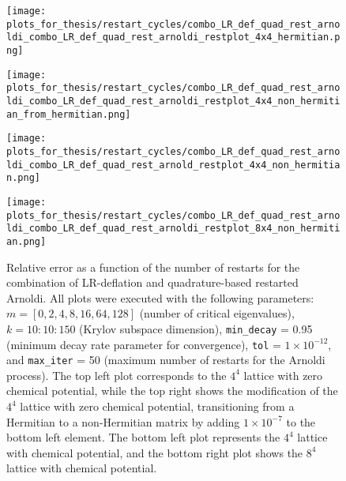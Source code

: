 \begin{figure}[H]
    \centering
    \begin{minipage}{0.45\textwidth}
        \centering
        \texttt{[image: plots\_for\_thesis/restart\_cycles/combo\_LR\_def\_quad\_rest\_arnoldi\_combo\_LR\_def\_quad\_rest\_arnoldi\_restplot\_4x4\_hermitian.png]} %
    \end{minipage}%
    \hspace{0.02\textwidth} %
    \begin{minipage}{0.45\textwidth}
        \centering
        \texttt{[image: plots\_for\_thesis/restart\_cycles/combo\_LR\_def\_quad\_rest\_arnoldi\_combo\_LR\_def\_quad\_rest\_arnoldi\_restplot\_4x4\_non\_hermitian\_from\_hermitian.png]} %
    \end{minipage}
    
    \vspace{0.02\textwidth} %
    
    \begin{minipage}{0.45\textwidth}
        \centering
        \texttt{[image: plots\_for\_thesis/restart\_cycles/combo\_LR\_def\_quad\_rest\_arnoldi\_combo\_LR\_def\_quad\_rest\_arnold\_restplot\_4x4\_non\_hermitian.png]} %
    \end{minipage}%
    \hspace{0.02\textwidth} %
    \begin{minipage}{0.45\textwidth}
        \centering
        \texttt{[image: plots\_for\_thesis/restart\_cycles/combo\_LR\_def\_quad\_rest\_arnoldi\_combo\_LR\_def\_quad\_rest\_arnoldi\_restplot\_8x4\_non\_hermitian.png]} %
    \end{minipage}
    
    \caption{\small Relative error as a function of the number of restarts for the combination of LR-deflation and quadrature-based restarted Arnoldi. All plots were executed with the following parameters: $m = [0, 2, 4, 8, 16, 64, 128]$ (number of critical eigenvalues), $k = 10:10:150$ (Krylov subspace dimension), \texttt{min\_decay} = 0.95 (minimum decay rate parameter for convergence), \texttt{tol} = $1 \times 10^{-12}$, and \texttt{max\_iter} = 50 (maximum number of restarts for the Arnoldi process). The top left plot corresponds to the $4^4$ lattice with zero chemical potential, while the top right shows the modification of the $4^4$ lattice with zero chemical potential, transitioning from a Hermitian to a non-Hermitian matrix by adding $1 \times 10^{-7}$ to the bottom left element. The bottom left plot represents the $4^4$ lattice with chemical potential, and the bottom right plot shows the $8^4$ lattice with chemical potential.}
    \label{fig:combo_LR+restarted_arnoldi_rest_plot}
\end{figure}

